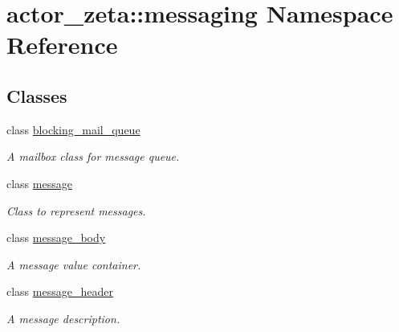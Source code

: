 \hypertarget{namespaceactor__zeta_1_1messaging}{}\section{actor\+\_\+zeta\+:\+:messaging Namespace Reference}
\label{namespaceactor__zeta_1_1messaging}
\subsection*{Classes}
\begin{DoxyCompactItemize}
\item 
class \hyperlink{classactor__zeta_1_1messaging_1_1blocking__mail__queue}{blocking\+\_\+mail\+\_\+queue}
\begin{DoxyCompactList}\small\item\em A mailbox class for message queue. \end{DoxyCompactList}\item 
class \hyperlink{classactor__zeta_1_1messaging_1_1message}{message}
\begin{DoxyCompactList}\small\item\em Class to represent messages. \end{DoxyCompactList}\item 
class \hyperlink{classactor__zeta_1_1messaging_1_1message__body}{message\+\_\+body}
\begin{DoxyCompactList}\small\item\em A message value container. \end{DoxyCompactList}\item 
class \hyperlink{classactor__zeta_1_1messaging_1_1message__header}{message\+\_\+header}
\begin{DoxyCompactList}\small\item\em A message description. \end{DoxyCompactList}\end{DoxyCompactItemize}
